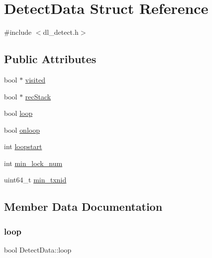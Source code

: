 \hypertarget{structDetectData}{}\section{Detect\+Data Struct Reference}
\label{structDetectData}


{\ttfamily \#include $<$dl\+\_\+detect.\+h$>$}

\subsection*{Public Attributes}
\begin{DoxyCompactItemize}
\item 
bool $\ast$ \hyperlink{structDetectData_a184e47a8dbf0ec5b7e6d56260539e5a7}{visited}
\item 
bool $\ast$ \hyperlink{structDetectData_ada628e4e23ddb400ff0aa2701e55f6bb}{rec\+Stack}
\item 
bool \hyperlink{structDetectData_ab4cfe8b5f88149d2bb79b5bde7ed70fe}{loop}
\item 
bool \hyperlink{structDetectData_a9c8e87d8758c712db2ab7b0ffea6d812}{onloop}
\item 
int \hyperlink{structDetectData_a88e3345e7dc32d5d3a12eb9d9539b994}{loopstart}
\item 
int \hyperlink{structDetectData_a8bf4ac7b3a76301900cd02ee8bbda86e}{min\+\_\+lock\+\_\+num}
\item 
uint64\+\_\+t \hyperlink{structDetectData_a051ad1425e676d42d39d2e9e584628ea}{min\+\_\+txnid}
\end{DoxyCompactItemize}


\subsection{Member Data Documentation}
\mbox{\label{structDetectData_ab4cfe8b5f88149d2bb79b5bde7ed70fe}} 
\subsubsection{\texorpdfstring{loop}{loop}}
{\footnotesize\ttfamily bool Detect\+Data\+::loop}

\mbox{\label{structDetectData_a88e3345e7dc32d5d3a12eb9d9539b994}} 
